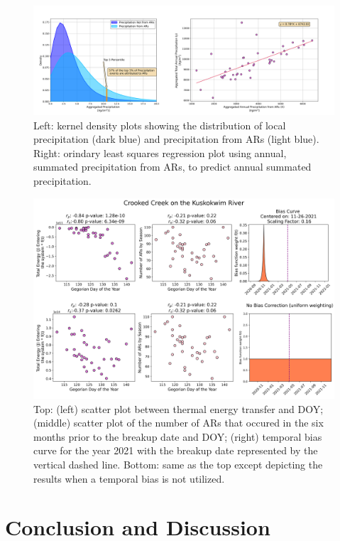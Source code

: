 \documentclass[draft]{AR_analysis_}
\begin{document}
\begin{figure}
\centering
\includegraphics[width=1.0\textwidth]{./images/concatenated_precip_var_plots.png}
\caption{Left: kernel density plots showing the distribution of
	local precipitation (dark blue) and precipitation from ARs
	(light blue). Right: orindary least squares regression plot
	using annual, summated precipitation from ARs, to predict annual
	summated precipitation.}
\label{fig:concatenated_precip_var_plots}
\end{figure}

\begin{figure}
\centering
\includegraphics[width=1.0\textwidth]{./images/concatenated_scatter_bias_plots.png}
	\caption{Top: (left) scatter plot between thermal energy
	transfer and DOY; (middle) scatter plot of the number of ARs
	that occured in the six months prior to the breakup date and
	DOY; 
	(right) temporal bias curve for the year 2021 with the breakup
	date represented by the vertical dashed line. Bottom: same as
	the top except depicting the results when a temporal bias
	is not utilized.}
\label{fig:concatenated_corr_plots}
\end{figure}

\section{Conclusion and Discussion}
\end{document}
